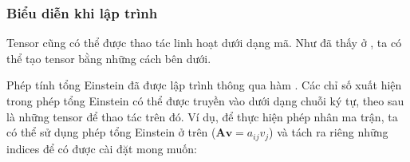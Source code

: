 \documentclass[letterpaper,11pt,english]{sphinxmanual}
\begin{document}
\subsubsection{Biểu diễn khi lập trình}
\label{\detokenize{chapter_appendix_math/geometry-linear-algebric-ops_vn:bieu-dien-khi-lap-trinh}}


Tensor cũng có thể được thao tác linh hoạt dưới dạng mã. Như đã thấy ở
, ta có thể tạo tensor bằng những cách bên
dưới.

\begin{sphinxVerbatim}[commandchars=\\\{\}]
  \PYG{p}{[}\PYG{p}{[}\PYG{p}{[}  \PYG{p}{]} \PYG{p}{[}  \PYG{p}{]}\PYG{p}{]} \PYG{p}{[}\PYG{p}{[}  \PYG{p}{]} \PYG{p}{[}  \PYG{p}{]}\PYG{p}{]}\PYG{p}{]}
  \PYG{p}{[}\PYG{p}{[} \PYG{p}{]} \PYG{p}{[} \PYG{p}{]}\PYG{p}{]}
  \PYG{p}{[} \PYG{p}{]}

  
\end{sphinxVerbatim}



Phép tính tổng Einstein đã được lập trình thông qua hàm .
Các chỉ số xuất hiện trong phép tổng Einstein có thể được truyền vào
dưới dạng chuỗi ký tự, theo sau là những tensor để thao tác trên đó. Ví
dụ, để thực hiện phép nhân ma trận, ta có thể sử dụng phép tổng Einstein
ở trên (\(\mathbf{A}\mathbf{v} = a_{ij}v_j\)) và tách ra riêng những
indices để có được cài đặt mong muốn:

\begin{sphinxVerbatim}[commandchars=\\\{\}]
   
\end{sphinxVerbatim}
\end{document}
